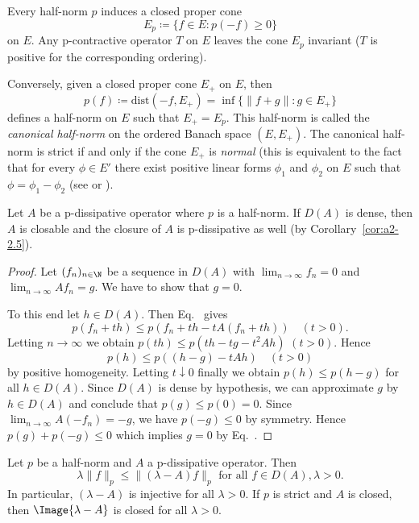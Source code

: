 \begin{remark}\label{rem:a2-2.8}
Every half-norm $p$ induces a closed proper cone 
\[
E_{p} \coloneqq \{f \in E \colon p(-f) \geq 0\}
\] 
on $E$.
Any p-contractive operator $T$ on $E$ leaves the cone $E_{p}$ invariant (\ie  $T$ is positive for the corresponding ordering).

Conversely, given a closed proper cone $E_{+}$ on $E$, then 
\[
p(f) \coloneqq \text{dist}(-f,E_{+}) = \inf\{\|f + g\| \colon g \in E_{+}\}
\]
defines a half-norm on $E$ such that $E_{+} = E_{p}$.
This half-norm is called the \emph{canonical half-norm} on the ordered Banach space $(E,E_{+})$.
The canonical half-norm is strict if and only if the cone $E_{+}$ is \emph{normal} (this is equivalent to the fact that for every $\phi \in E'$ there exist positive linear forms $\phi_{1}$ and $\phi_{2}$ on $E$ such that $\phi = \phi_{1} - \phi_{2}$ (see \textcite{battyrobinson:1984} or \textcite[Chapter V]{schaefer:1966}).
\end{remark}
\begin{proposition}\label{prop:a2-2.9}
Let $A$ be a p-dissipative operator where $p$ is a half-norm.
If\/ $D(A)$ is dense, then $A$ is closable and the closure of\/ $A$ is p-dissipative as well (by Corollary~\ref{cor:a2-2.5}). 
\end{proposition}
\begin{proof}
Let $(f_{n})_{n \in \N}$ be a sequence in $D(A)$ with $\lim_{n \to \infty} f_{n} = 0$ and $\lim_{n \to \infty} Af_{n} = g$.
We have to show that $g = 0$.

To this end let $h \in D(A)$.
Then Eq.~   
gives 
%	
\[
p(f_{n} + th) \leq p(f_{n} + th - tA(f_{n} + th)) \quad (t > 0) .
\]
%
Letting $n \to \infty$ we obtain 
$p(th) \leq p(th - tg - t^{2}Ah)$ \quad $(t > 0)$.
Hence 
\[
p(h) \leq p((h-g) - tAh) \quad (t > 0)
\] 
by positive homogeneity.
Letting $t \downarrow 0$ finally we obtain $p(h) \leq p(h - g)$ for all $h \in D(A)$.
Since $D(A)$ is dense by hypothesis, we can approximate $g$ by $h \in D(A)$ and conclude that $p(g) \leq p(0) = 0$.
Since $\lim_{n\to\infty} A(-f_{n}) = -g$, we have $p(-g) \leq 0$ by symmetry.
Hence $p(g) + p(-g) \leq 0$ which implies $g = 0$ by Eq.~. 
\end{proof}
\begin{lemma}\label{lem:a2-2.10}
Let $p$ be a half-norm and $A$ a p-dissipative operator.
Then
\begin{equation}\label{eq:a2-2.14}
\lambda\|f\|_{p} \leq \|(\lambda - A)f\|_{p} \text{ for all } f \in D(A), \lambda > 0.
\end{equation}
In particular, $(\lambda-A)$ is injective for all $\lambda > 0$.
If\/ $p$ is strict and $A$ is closed, then $\Image{\lambda - A}$ is closed for all $\lambda > 0$.
\end{lemma}

